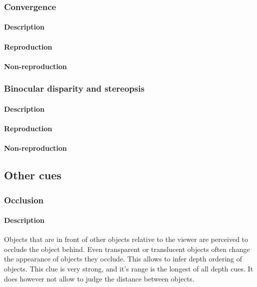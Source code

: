 \subsubsection{Convergence}
\paragraph{Description}

\paragraph{Reproduction}

\paragraph{Non-reproduction}


\subsubsection{Binocular disparity and stereopsis}
\paragraph{Description}

\paragraph{Reproduction}

\paragraph{Non-reproduction}



\subsection{Other cues}


\subsubsection{Occlusion}
\paragraph{Description}
Objects that are in front of other objects relative to the viewer are perceived to occlude the object behind. Even transparent or translucent objects often change the appearance of objects they occlude. This allows to infer depth ordering of objects. This clue is very strong, and it's range is the longest of all depth cues. It does however not allow to judge the distance between objects.

